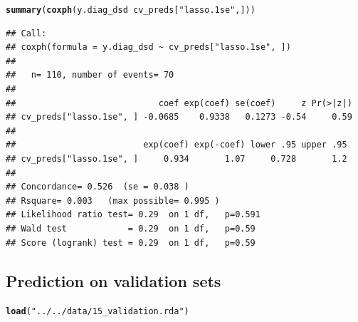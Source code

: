 \documentclass{article}\usepackage[]{graphicx}\usepackage[]{color}
\makeatletter
\newcommand{\hlstr}[1]{\textcolor[rgb]{0.192,0.494,0.8}{#1}}%
\newcommand{\hlopt}[1]{\textcolor[rgb]{0,0,0}{#1}}%
\newcommand{\hlstd}[1]{\textcolor[rgb]{0.345,0.345,0.345}{#1}}%
\newcommand{\hlkwd}[1]{\textcolor[rgb]{0.737,0.353,0.396}{\textbf{#1}}}%
\newenvironment{kframe}{%
 \def\at@end@of@kframe{}%
 \ifinner\ifhmode%
  \def\at@end@of@kframe{\end{minipage}}%
  \begin{minipage}{\columnwidth}%
 \fi\fi%
 \def\FrameCommand##1{\hskip\@totalleftmargin \hskip-\fboxsep
 \colorbox{shadecolor}{##1}\hskip-\fboxsep
     \hskip-\linewidth \hskip-\@totalleftmargin \hskip\columnwidth}%
 \MakeFramed {\advance\hsize-\width
   \@totalleftmargin\z@ \linewidth\hsize
   \@setminipage}}%
 {\par\unskip\endMakeFramed%
 \at@end@of@kframe}
\newenvironment{knitrout}{}{} %
\makeatother
\begin{document}
\begin{knitrout}
\color{fgcolor}\begin{kframe}
\begin{alltt}
\hlkwd{summary}\hlstd{(}\hlkwd{coxph}\hlstd{(y.diag_dsd} \hlopt{~} \hlstd{cv_preds[}\hlstr{"lasso.1se"}\hlstd{, ]))}
\end{alltt}
\begin{verbatim}
## Call:
## coxph(formula = y.diag_dsd ~ cv_preds["lasso.1se", ])
## 
##   n= 110, number of events= 70 
## 
##                            coef exp(coef) se(coef)     z Pr(>|z|)
## cv_preds["lasso.1se", ] -0.0685    0.9338   0.1273 -0.54     0.59
## 
##                         exp(coef) exp(-coef) lower .95 upper .95
## cv_preds["lasso.1se", ]     0.934       1.07     0.728       1.2
## 
## Concordance= 0.526  (se = 0.038 )
## Rsquare= 0.003   (max possible= 0.995 )
## Likelihood ratio test= 0.29  on 1 df,   p=0.591
## Wald test            = 0.29  on 1 df,   p=0.59
## Score (logrank) test = 0.29  on 1 df,   p=0.59
\end{verbatim}
\end{kframe}
\end{knitrout}


\subsection{Prediction on validation sets}
\begin{knitrout}
\color{fgcolor}\begin{kframe}
\begin{alltt}
\hlkwd{load}\hlstd{(}\hlstr{"../../data/15_validation.rda"}\hlstd{)}
\end{alltt}
\end{kframe}
\end{knitrout}
\end{document}
